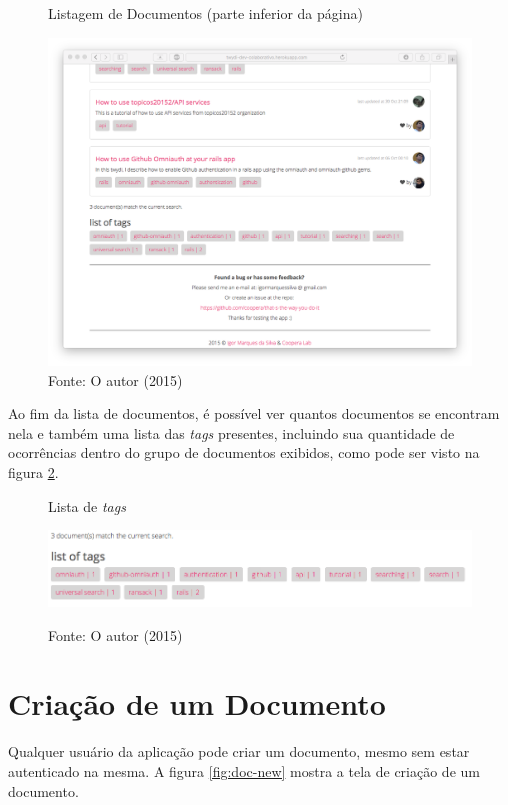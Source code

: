 \begin{figure}[b]
	\centering
    \caption{Listagem de Documentos (parte inferior da página)}
		\label{fig:doc-list-2}
    \includegraphics[width=13cm]{Imagens/print-lista-2.png}
	\caption*{Fonte: O autor (2015)}
\end{figure}

\clearpage

Ao fim da lista de documentos, é possível ver quantos documentos se encontram nela e também uma lista das \textit{tags} presentes, incluindo sua quantidade de ocorrências dentro do grupo de documentos exibidos, como pode ser visto na figura \ref{fig:doc-tags}.

\begin{figure}[ht]
	\centering
    \caption{Lista de \textit{tags}}
    \includegraphics[width=15cm]{Imagens/print-tags.png}
		\label{fig:doc-tags}
	\caption*{Fonte: O autor (2015)}
\end{figure}


\section{Criação de um Documento}

Qualquer usuário da aplicação pode criar um documento, mesmo sem estar autenticado na mesma. A figura \ref{fig:doc-new} mostra a tela de criação de um documento.

